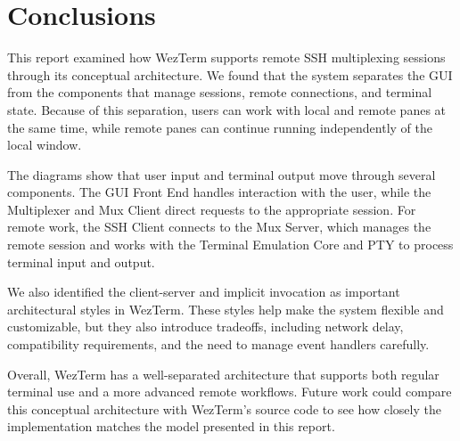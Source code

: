 \section{Conclusions}
\label{sec:conclusions}

This report examined how WezTerm supports remote SSH multiplexing sessions through its conceptual architecture. We found that the system separates the GUI from the components that manage sessions, remote connections, and terminal state. Because of this separation, users can work with local and remote panes at the same time, while remote panes can continue running independently of the local window.

The diagrams show that user input and terminal output move through several components. The GUI Front End handles interaction with the user, while the Multiplexer and Mux Client direct requests to the appropriate session. For remote work, the SSH Client connects to the Mux Server, which manages the remote session and works with the Terminal Emulation Core and PTY to process terminal input and output.

We also identified the client-server and implicit invocation as important architectural styles in WezTerm. These styles help make the system flexible and customizable, but they also introduce tradeoffs, including network delay, compatibility requirements, and the need to manage event handlers carefully.

Overall, WezTerm has a well-separated architecture that supports both regular terminal use and a more advanced remote workflows. Future work could compare this conceptual architecture with WezTerm’s source code to see how closely the implementation matches the model presented in this report.